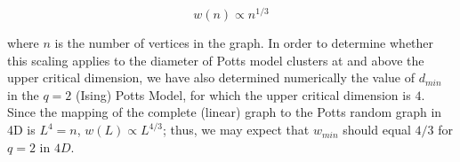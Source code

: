 \documentclass[pre,preprint,11pt]{revtex4}
\newcommand{\lb}{{\langle}}
\newcommand{\rb}{{\rangle}}
\begin{document}
\begin {equation}
w(n) \propto n^{1/3}
\end {equation}

where $n$ is the number of vertices in the graph.  In order to determine whether this scaling applies to the diameter of Potts model clusters at and above the upper critical dimension, we have also determined numerically the value of $d_{min}$ in the $q=2$ (Ising) Potts Model, for which the upper critical dimension is $4$.  Since the mapping of the complete (linear) graph to the Potts random graph in 4D is $L^4=n$, $w(L) \propto L^{4/3}$; thus, we may expect that $w_{min}$ should equal $4/3$ for $q=2$ in $4D$.




\end{document}
